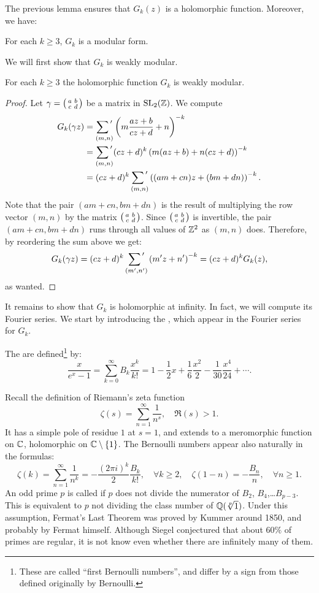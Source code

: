 The previous lemma ensures that $G_k(z)$ is a holomorphic function. Moreover, we have:
\begin{theorem}
  For each $k\geq 3$, $G_k$ is a modular form.
\end{theorem}

We will first show that $G_k$ is weakly modular.
\begin{proposition}
  For each $k\geq 3$ the holomorphic function $G_k$ is weakly modular.
\end{proposition}
\begin{proof}
Let $\gamma = \left(\begin{smallmatrix}a&b\\c&d\end{smallmatrix}\right)$ be a matrix in $\operatorname{SL}_2(\mathbb{Z})$. We compute
\begin{align*}
G_k(\gamma z) &= \sumprime_{(m,n)} \left(m\frac{az+b}{cz+d} + n\right)^{-k}\\
&= \sumprime_{(m,n)} (cz+d)^k \left(m(az+b)+n(cz+d)\right)^{-k}\\
&= (cz+d)^k\sumprime_{(m,n)}\left( (am+cn)z + (bm+dn)\right)^{-k}.
\end{align*}
Note that the pair $(am+cn,bm+dn)$ is the result of multiplying the row vector $(m,n)$ by the matrix $\left(\begin{smallmatrix}a&b\\c&d\end{smallmatrix}\right)$. Since $\left(\begin{smallmatrix}a&b\\c&d\end{smallmatrix}\right)$ is invertible, the pair $(am+cn,bm+dn)$ runs through all values of $\mathbb{Z}^2$ as $(m,n)$ does. Therefore, by reordering the sum above we get:
\[
G_k(\gamma z) = (cz+d)^k \sumprime_{(m',n')} \left( m'z+n'\right)^{-k} = (cz+d)^k G_k(z),
\]
as wanted.
\end{proof}
It remains to show that $G_k$ is holomorphic at infinity. In fact, we will compute its Fourier series. We start by introducing the , which appear in the Fourier series for $G_k$.

\begin{definition}
  The  are defined\footnote{These are called ``first Bernoulli numbers'', and differ by a sign from those defined originally by Bernoulli.} by:
\begin{equation}
\label{eq:bernoulli-numbers}
\frac{x}{e^x -1} = \sum_{k=0}^\infty B_k \frac{x^k}{k!} = 1 -\frac 1 2 x + \frac 1{6} \frac{x^2}{2} - \frac 1{30}\frac{x^4}{24} + \cdots.
\end{equation}
\end{definition}
Recall the definition of Riemann's zeta function
\[
\zeta(s) = \sum_{n=1}^\infty \frac{1}{n^s},\quad \Re(s)>1.
\]
It has a simple pole of residue $1$ at $s=1$, and extends to a meromorphic function on $\mathbb{C}$, holomorphic on $\mathbb{C}\setminus \{1\}$. The Bernoulli numbers appear also naturally in the formulas:
\begin{equation}
\label{eq:bernoulli-zeta}
\zeta(k) = \sum_{n=1}^\infty \frac{1}{n^k} = -\frac{(2\pi i)^k}{2}\frac{B_k}{k!},\quad \forall k \geq 2,\quad \zeta(1-n) = -\frac{B_n}{n},\quad \forall n \geq 1.
\end{equation}
An odd prime $p$ is called  if $p$ does not divide the numerator of $B_2$, $B_4$,\ldots $B_{p-3}$. This is equivalent to $p$ not dividing the class number of $\mathbb{Q}(\sqrt[p]{1})$. Under this assumption, Fermat's Last Theorem was proved by Kummer around 1850, and probably by Fermat himself. Although Siegel conjectured that about $60\%$ of primes are regular, it is not know even whether there are infinitely many of them.


